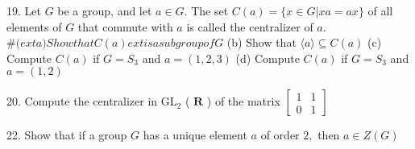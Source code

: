 \begin{mdframed}[style=darkAnswer,frametitle={Joe Starr}]
    
\end{mdframed}
\newpage
\begin{mdframed}[style=darkQuesion]
  19. Let $G$ be a group, and let $a \in G .$ The set $C(a)=\{x \in G | x a=a x\}$ of all elements of $G$ that commute with $a$ is called the centralizer of $a .$
  $\#(  ext { a ) Show that } C(a)   ext { is a subgroup of } G$
  (b) Show that $\langle a\rangle \subseteq C(a)$
  (c) Compute $C(a)$ if $G=S_{3}$ and $a=(1,2,3)$
  (d) Compute $C(a)$ if $G=S_{3}$ and $a=(1,2)$
    
\end{mdframed}

\begin{mdframed}[style=darkAnswer,frametitle={Joe Starr}]
    
\end{mdframed}
\newpage
\begin{mdframed}[style=darkQuesion]
  20. Compute the centralizer in $\mathrm{GL}_{2}$ ( $\mathbf{R}$ ) of the matrix $\left[\begin{array}{ll}1 & 1 \\ 0 & 1\end{array}\right]$
    
\end{mdframed}

\begin{mdframed}[style=darkAnswer,frametitle={Joe Starr}]
    
\end{mdframed}
\newpage
\begin{mdframed}[style=darkQuesion]
  22. Show that if a group $G$ has a unique element $a$ of order $2,$ then $a \in Z(G)$
    
\end{mdframed}

